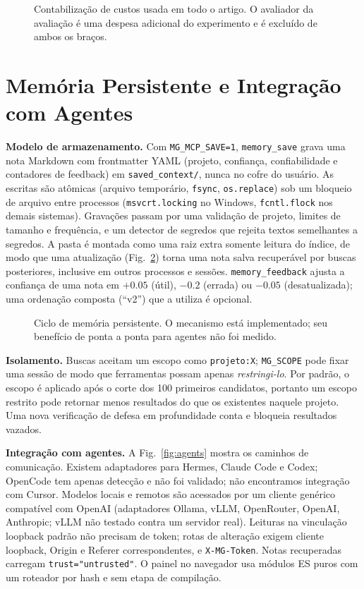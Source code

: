 \documentclass[conference,onecolumn,11pt]{IEEEtran}
\begin{document}
\begin{figure}[!htbp]\centering
{}
\caption{Contabilização de custos usada em todo o artigo. O avaliador da avaliação é uma despesa adicional do experimento e é excluído de ambos os braços.}\label{fig:costacct}
\end{figure}

\section{Memória Persistente e Integração com Agentes}\label{sec:persist}
\textbf{Modelo de armazenamento.} Com \texttt{MG\_MCP\_SAVE=1}, \texttt{memory\_save} grava uma nota Markdown com frontmatter YAML (projeto, confiança, confiabilidade e contadores de feedback) em \texttt{saved\_context/}, nunca no cofre do usuário. As escritas são atômicas (arquivo temporário, \texttt{fsync}, \texttt{os.replace}) sob um bloqueio de arquivo entre processos (\texttt{msvcrt.locking} no Windows, \texttt{fcntl.flock} nos demais sistemas). Gravações passam por uma validação de projeto, limites de tamanho e frequência, e um detector de segredos que rejeita textos semelhantes a segredos. A pasta é montada como uma raiz extra somente leitura do índice, de modo que uma atualização (Fig.~\ref{fig:persist}) torna uma nota salva recuperável por buscas posteriores, inclusive em outros processos e sessões. \texttt{memory\_feedback} ajusta a confiança de uma nota em $+0.05$ (útil), $-0.2$ (errada) ou $-0.05$ (desatualizada); uma ordenação composta (``v2'') que a utiliza é opcional.

\begin{figure}[!htbp]\centering
{}
\caption{Ciclo de memória persistente. O mecanismo está implementado; seu benefício de ponta a ponta para agentes não foi medido.}\label{fig:persist}
\end{figure}

\textbf{Isolamento.} Buscas aceitam um escopo como \texttt{projeto:X}; \texttt{MG\_SCOPE} pode fixar uma sessão de modo que ferramentas possam apenas \emph{restringi-lo}. Por padrão, o escopo é aplicado após o corte dos 100 primeiros candidatos, portanto um escopo restrito pode retornar menos resultados do que os existentes naquele projeto. Uma nova verificação de defesa em profundidade conta e bloqueia resultados vazados.

\textbf{Integração com agentes.} A Fig.~\ref{fig:agents} mostra os caminhos de comunicação. Existem adaptadores para Hermes, Claude Code e Codex; OpenCode tem apenas detecção e não foi validado; não encontramos integração com Cursor. Modelos locais e remotos são acessados por um cliente genérico compatível com OpenAI (adaptadores Ollama, vLLM, OpenRouter, OpenAI, Anthropic; vLLM não testado contra um servidor real). Leituras na vinculação loopback padrão não precisam de token; rotas de alteração exigem cliente loopback, Origin e Referer correspondentes, e \texttt{X-MG-Token}. Notas recuperadas carregam \texttt{trust="untrusted"}. O painel no navegador usa módulos ES puros com um roteador por hash e sem etapa de compilação.
\end{document}
